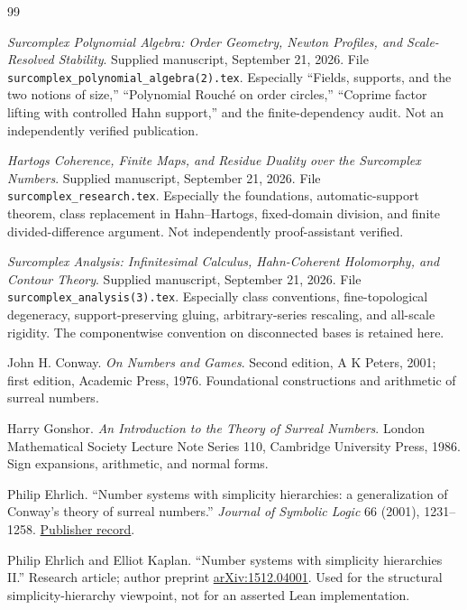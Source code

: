 \documentclass[11pt,letterpaper]{article}
\numberwithin{equation}{section}
\theoremstyle{definition}
\theoremstyle{remark}
\begin{document}
\begin{thebibliography}{99}
\small

\emph{Surcomplex Polynomial Algebra: Order Geometry, Newton Profiles, and Scale-Resolved Stability}. Supplied manuscript, September 21, 2026. File \texttt{surcomplex\_polynomial\_algebra(2).tex}. Especially ``Fields, supports, and the two notions of size,'' ``Polynomial Rouch\'e on order circles,'' ``Coprime factor lifting with controlled Hahn support,'' and the finite-dependency audit. Not an independently verified publication.

\emph{Hartogs Coherence, Finite Maps, and Residue Duality over the Surcomplex Numbers}. Supplied manuscript, September 21, 2026. File \texttt{surcomplex\_research.tex}. Especially the foundations, automatic-support theorem, class replacement in Hahn--Hartogs, fixed-domain division, and finite divided-difference argument. Not independently proof-assistant verified.

\emph{Surcomplex Analysis: Infinitesimal Calculus, Hahn-Coherent Holomorphy, and Contour Theory}. Supplied manuscript, September 21, 2026. File \texttt{surcomplex\_analysis(3).tex}. Especially class conventions, fine-topological degeneracy, support-preserving gluing, arbitrary-series rescaling, and all-scale rigidity. The componentwise convention on disconnected bases is retained here.

John H. Conway. \emph{On Numbers and Games}. Second edition, A K Peters, 2001; first edition, Academic Press, 1976. Foundational constructions and arithmetic of surreal numbers.

Harry Gonshor. \emph{An Introduction to the Theory of Surreal Numbers}. London Mathematical Society Lecture Note Series 110, Cambridge University Press, 1986. Sign expansions, arithmetic, and normal forms.

Philip Ehrlich. ``Number systems with simplicity hierarchies: a generalization of Conway's theory of surreal numbers.'' \emph{Journal of Symbolic Logic} 66 (2001), 1231--1258.
\href{https://www.cambridge.org/core/journals/journal-of-symbolic-logic/article/abs/number-systems-with-simplicity-hierarchies-a-generalization-of-conways-theory-of-surreal-numbers/D3A23E34429CD0D6350D83B568C9F477}{Publisher record}.

Philip Ehrlich and Elliot Kaplan. ``Number systems with simplicity hierarchies II.'' Research article; author preprint \href{https://arxiv.org/abs/1512.04001}{arXiv:1512.04001}. Used for the structural simplicity-hierarchy viewpoint, not for an asserted Lean implementation.


\end{thebibliography}
\end{document}

